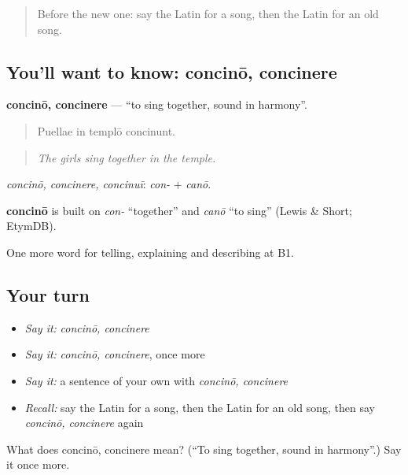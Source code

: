 \begin{quote}
Before the new one: say the Latin for a song, then the Latin for an old song.
\end{quote}

\subsection*{You'll want to know: concinō, concinere}
\textbf{concinō, concinere} — \textquotedblleft{}to sing together, sound in harmony\textquotedblright{}.

\begin{quote}
Puellae in templō concinunt.
\end{quote}

\begin{quote}
\emph{The girls sing together in the temple.}
\end{quote}

\emph{concinō, concinere, concinuī}: \emph{con-} + \emph{canō}.

\begin{cousinweb}
\textbf{concinō} is built on \emph{con-} \textquotedblleft{}together\textquotedblright{} and \emph{canō} \textquotedblleft{}to sing\textquotedblright{} (Lewis \& Short; EtymDB).
\end{cousinweb}

\begin{grammarlens}[title={What you've built}]
One more word for telling, explaining and describing at B1.
\end{grammarlens}

\subsection*{Your turn}
\begin{itemize}
\raggedright
  \item \emph{Say it:} \emph{concinō, concinere}
  \item \emph{Say it:} \emph{concinō, concinere}, once more
  \item \emph{Say it:} a sentence of your own with \emph{concinō, concinere}
  \item \emph{Recall:} say the Latin for a song, then the Latin for an old song, then say \emph{concinō, concinere} again
\end{itemize}

\begin{tcolorbox}[breakable,colback=teal!4,colframe=teal!35!black,title={Before you move on}]
What does concinō, concinere mean? (\textquotedblleft{}To sing together, sound in harmony\textquotedblright{}.) Say it once more.
\end{tcolorbox}
